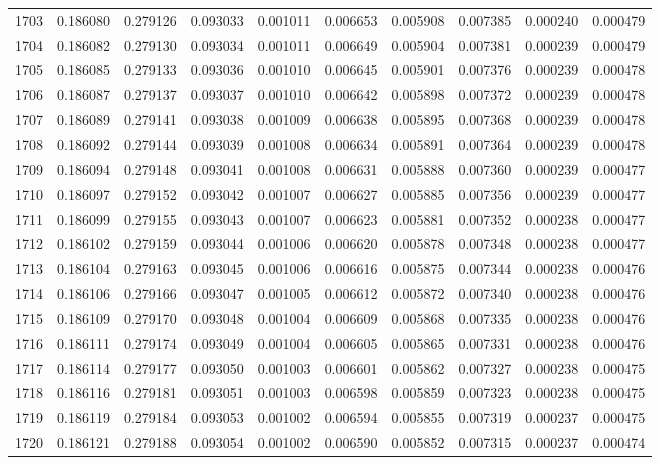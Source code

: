 \begin{tabular}{lrrrrrrrrr}
1703 & 0.186080 & 0.279126 & 0.093033 & 0.001011 & 0.006653 & 0.005908 & 0.007385 & 0.000240 & 0.000479 \\
1704 & 0.186082 & 0.279130 & 0.093034 & 0.001011 & 0.006649 & 0.005904 & 0.007381 & 0.000239 & 0.000479 \\
1705 & 0.186085 & 0.279133 & 0.093036 & 0.001010 & 0.006645 & 0.005901 & 0.007376 & 0.000239 & 0.000478 \\
1706 & 0.186087 & 0.279137 & 0.093037 & 0.001010 & 0.006642 & 0.005898 & 0.007372 & 0.000239 & 0.000478 \\
1707 & 0.186089 & 0.279141 & 0.093038 & 0.001009 & 0.006638 & 0.005895 & 0.007368 & 0.000239 & 0.000478 \\
1708 & 0.186092 & 0.279144 & 0.093039 & 0.001008 & 0.006634 & 0.005891 & 0.007364 & 0.000239 & 0.000478 \\
1709 & 0.186094 & 0.279148 & 0.093041 & 0.001008 & 0.006631 & 0.005888 & 0.007360 & 0.000239 & 0.000477 \\
1710 & 0.186097 & 0.279152 & 0.093042 & 0.001007 & 0.006627 & 0.005885 & 0.007356 & 0.000239 & 0.000477 \\
1711 & 0.186099 & 0.279155 & 0.093043 & 0.001007 & 0.006623 & 0.005881 & 0.007352 & 0.000238 & 0.000477 \\
1712 & 0.186102 & 0.279159 & 0.093044 & 0.001006 & 0.006620 & 0.005878 & 0.007348 & 0.000238 & 0.000477 \\
1713 & 0.186104 & 0.279163 & 0.093045 & 0.001006 & 0.006616 & 0.005875 & 0.007344 & 0.000238 & 0.000476 \\
1714 & 0.186106 & 0.279166 & 0.093047 & 0.001005 & 0.006612 & 0.005872 & 0.007340 & 0.000238 & 0.000476 \\
1715 & 0.186109 & 0.279170 & 0.093048 & 0.001004 & 0.006609 & 0.005868 & 0.007335 & 0.000238 & 0.000476 \\
1716 & 0.186111 & 0.279174 & 0.093049 & 0.001004 & 0.006605 & 0.005865 & 0.007331 & 0.000238 & 0.000476 \\
1717 & 0.186114 & 0.279177 & 0.093050 & 0.001003 & 0.006601 & 0.005862 & 0.007327 & 0.000238 & 0.000475 \\
1718 & 0.186116 & 0.279181 & 0.093051 & 0.001003 & 0.006598 & 0.005859 & 0.007323 & 0.000238 & 0.000475 \\
1719 & 0.186119 & 0.279184 & 0.093053 & 0.001002 & 0.006594 & 0.005855 & 0.007319 & 0.000237 & 0.000475 \\
1720 & 0.186121 & 0.279188 & 0.093054 & 0.001002 & 0.006590 & 0.005852 & 0.007315 & 0.000237 & 0.000474 \\

\end{tabular}
